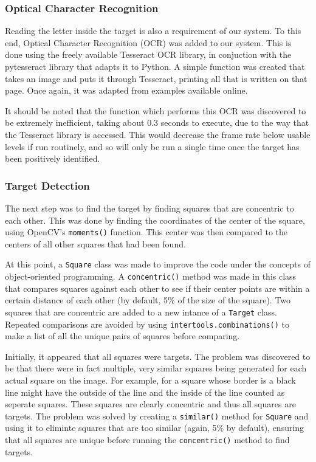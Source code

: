 \documentclass[11pt]{article}
\begin{document}
\subsubsection{Optical Character Recognition}
Reading the letter inside the target is also a requirement of our system. To this end, Optical Character Recognition (OCR) was added to our system. This is done using the freely available Tesseract OCR library, in conjuction with the pytesseract library that adapts it to Python. A simple function was created that takes an image and puts it through Tesseract, printing all that is written on that page. Once again, it was adapted from examples available online.\cite{pyimagesearch_ocr}

It should be noted that the function which performs this OCR was discovered to be extremely inefficient, taking about 0.3 seconds to execute, due to the way that the Tesseract library is accessed. This would decrease the frame rate below usable levels if run routinely, and so will only be run a single time once the target has been positively identified.

\subsubsection{Target Detection}
The next step was to find the target by finding squares that are concentric to each other. This was done by finding the coordinates of the center of the square, using OpenCV's \lstinline|moments()| function. This center was then compared to the centers of all other squares that had been found.

At this point, a \lstinline|Square| class was made to improve the code under the concepts of object-oriented programming. A \lstinline|concentric()| method was made in this class that compares squares against each other to see if their center points are within a certain distance of each other (by default, 5\% of the size of the square). Two squares that are concentric are added to a new intance of a \lstinline|Target| class. Repeated comparisons are avoided by using \lstinline|intertools.combinations()| to make a list of all the unique pairs of squares before comparing.

Initially, it appeared that all squares were targets. The problem was discovered to be that there were in fact multiple, very similar squares being generated for each actual square on the image. For example, for a square whose border is a black line might have the outside of the line and the inside of the line counted as seperate squares. These squares are clearly concentric and thus all squares are targets. The problem was solved by creating a \lstinline|similar()| method for \lstinline|Square| and using it to eliminte squares that are too similar (again, 5\% by default), ensuring that all squares are unique before running the \lstinline|concentric()| method to find targets.
\end{document}

